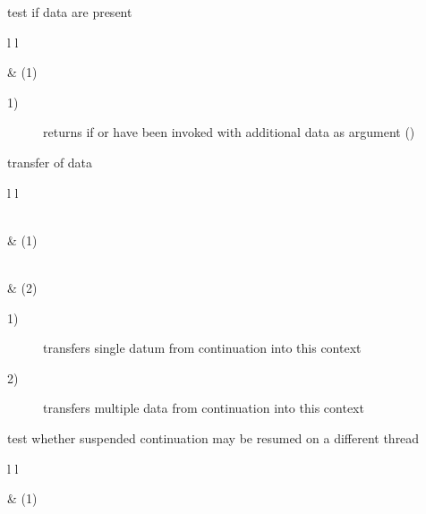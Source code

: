 
test if data are present\\

\begin{tabular}{ l l }
    \midrule

     & (1)\\

    \midrule
\end{tabular}

\begin{description}
    \item[1)] returns  if \call or \resume have been invoked with
              additional data as argument ()
\end{description}



transfer of data\\

\begin{tabular}{ l l }
    \midrule

    \\
     & (1)\\

    \midrule

    \\
     & (2)\\

    \midrule
\end{tabular}

\begin{description}
    \item[1)] transfers single datum from continuation  into this context
    \item[2)] transfers multiple data from continuation  into this
              context
\end{description}



test whether suspended continuation may be resumed on a different thread\\

\begin{tabular}{ l l }
    \midrule

     & (1)\\

    \midrule
\end{tabular}


